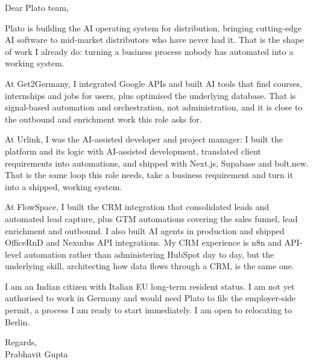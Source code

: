 \documentclass[a4paper,11pt]{article}
\begin{document}
Dear Plato team,

Plato is building the AI operating system for distribution, bringing cutting-edge AI software to mid-market distributors who have never had it. That is the shape of work I already do: turning a business process nobody has automated into a working system.

At Get2Germany, I integrated Google APIs and built AI tools that find courses, internships and jobs for users, plus optimised the underlying database. That is signal-based automation and orchestration, not administration, and it is close to the outbound and enrichment work this role asks for.

At Urlink, I was the AI-assisted developer and project manager: I built the platform and its logic with AI-assisted development, translated client requirements into automations, and shipped with Next.js, Supabase and bolt.new. That is the same loop this role needs, take a business requirement and turn it into a shipped, working system.

At FlowSpace, I built the CRM integration that consolidated leads and automated lead capture, plus GTM automations covering the sales funnel, lead enrichment and outbound. I also built AI agents in production and shipped OfficeRnD and Nexudus API integrations. My CRM experience is n8n and API-level automation rather than administering HubSpot day to day, but the underlying skill, architecting how data flows through a CRM, is the same one.

I am an Indian citizen with Italian EU long-term resident status. I am not yet authorised to work in Germany and would need Plato to file the employer-side permit, a process I am ready to start immediately. I am open to relocating to Berlin.

Regards,\\
Prabhavit Gupta
\end{document}

